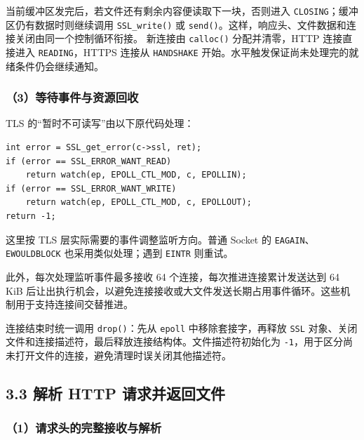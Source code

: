\documentclass[UTF8,11pt,a4paper,fontset=fandol]{ctexart}
\begin{document}
当前缓冲区发完后，若文件还有剩余内容便读取下一块，否则进入 \texttt{CLOSING}；缓冲区仍有数据时则继续调用 \texttt{SSL\_\allowbreak{}write(\allowbreak{})\allowbreak{}} 或 \texttt{send(\allowbreak{})\allowbreak{}}。这样，响应头、文件数据和连接关闭由同一个控制循环衔接。
新连接由 \texttt{calloc(\allowbreak{})\allowbreak{}} 分配并清零，HTTP 连接直接进入 \texttt{READING}，HTTPS 连接从 \texttt{HANDSHAKE} 开始。水平触发保证尚未处理完的就绪条件仍会继续通知。


\subsubsection*{（3）等待事件与资源回收}

TLS 的“暂时不可读写”由以下原代码处理：


\Needspace{80pt}
\noindent\begin{minipage}{\linewidth}
\begin{lstlisting}
int error = SSL_get_error(c->ssl, ret);
if (error == SSL_ERROR_WANT_READ)
	return watch(ep, EPOLL_CTL_MOD, c, EPOLLIN);
if (error == SSL_ERROR_WANT_WRITE)
	return watch(ep, EPOLL_CTL_MOD, c, EPOLLOUT);
return -1;
\end{lstlisting}
\end{minipage}
\par

这里按 TLS 层实际需要的事件调整监听方向。普通 Socket 的 \texttt{EAGAIN}、\texttt{EWOULDBLOCK} 也采用类似处理；遇到 \texttt{EINTR} 则重试。


此外，每次处理监听事件最多接收 64 个连接，每次推进连接累计发送达到 64 KiB 后让出执行机会，以避免连接接收或大文件发送长期占用事件循环。这些机制用于支持连接间交替推进。


连接结束时统一调用 \texttt{drop(\allowbreak{})\allowbreak{}}：先从 \texttt{epoll} 中移除套接字，再释放 \texttt{SSL} 对象、关闭文件和连接描述符，最后释放连接结构体。文件描述符初始化为 \texttt{-1}，用于区分尚未打开文件的连接，避免清理时误关闭其他描述符。


\subsection*{3.3 解析 HTTP 请求并返回文件}

\subsubsection*{（1）请求头的完整接收与解析}
\end{document}
